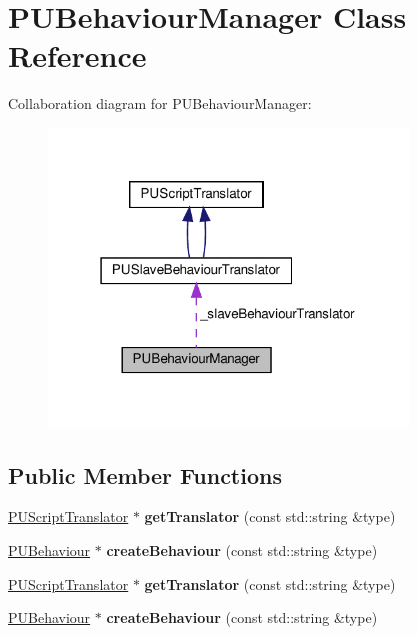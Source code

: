 \hypertarget{classPUBehaviourManager}{}\section{P\+U\+Behaviour\+Manager Class Reference}
\label{classPUBehaviourManager}


Collaboration diagram for P\+U\+Behaviour\+Manager\+:
\nopagebreak
\begin{figure}[H]
\begin{center}
\leavevmode
\includegraphics[width=271pt]{classPUBehaviourManager__coll__graph}
\end{center}
\end{figure}
\subsection*{Public Member Functions}
\begin{DoxyCompactItemize}
\item 
\mbox{\label{classPUBehaviourManager_a9f0d510e3638959a8f16f9cf2b374e8d}} 
\hyperlink{classPUScriptTranslator}{P\+U\+Script\+Translator} $\ast$ {\bfseries get\+Translator} (const std\+::string \&type)
\item 
\mbox{\label{classPUBehaviourManager_ae71fbda180a943590d0f63919133ad1a}} 
\hyperlink{classPUBehaviour}{P\+U\+Behaviour} $\ast$ {\bfseries create\+Behaviour} (const std\+::string \&type)
\item 
\mbox{\label{classPUBehaviourManager_a5b102e7c4ac10800b1ce82d84d202bb5}} 
\hyperlink{classPUScriptTranslator}{P\+U\+Script\+Translator} $\ast$ {\bfseries get\+Translator} (const std\+::string \&type)
\item 
\mbox{\label{classPUBehaviourManager_acf11648db678df9a4d7c5aef8b5b8835}} 
\hyperlink{classPUBehaviour}{P\+U\+Behaviour} $\ast$ {\bfseries create\+Behaviour} (const std\+::string \&type)
\end{DoxyCompactItemize}
